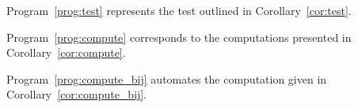 Program~\ref{prog:test} represents the test outlined in Corollary~\ref{cor:test}. \newpage



Program~\ref{prog:compute} corresponds to the computations presented in Corollary~\ref{cor:compute}. 



\newpage
Program~\ref{prog:compute_bij} automates the computation given in Corollary~\ref{cor:compute_bij}. 



